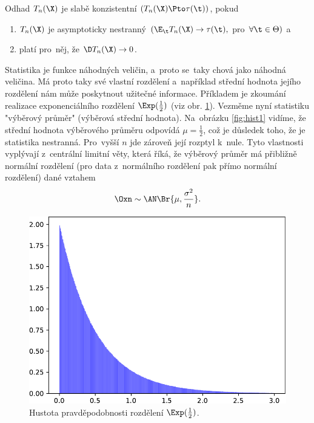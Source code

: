 \begin{theorem}
	Odhad $T_n(\X)$ je slabě konzistentní $(T_n(\X)\Pto\tau(\t))$, pokud \begin{enumerate}
		\item $T_n(\X)$ je asymptoticky nestranný $(\E_\t T_n(\X)\to\tau(\t),$ pro~$\forall\t\in\Theta)$ a
		\item platí pro~něj, že $\D T_n(\X)\to0$.
	\end{enumerate}
\end{theorem}

\begin{example}
	Statistika je funkce náhodných veličin, a~proto se~taky chová jako náhodná veličina. Má proto taky své vlastní rozdělení a~například střední hodnota jejího rozdělení nám může poskytnout užitečné informace. Příkladem je zkoumání realizace exponenciálního rozdělení $\Exp(\frac{1}{2})$ (viz obr. \ref{fig:hist0}). Vezměme nyní statistiku "výběrový průměr" (výběrová střední hodnota). Na~obrázku \ref{fig:hist1} vidíme, že střední hodnota výběrového průměru odpovídá $\mu=\frac{1}{2}$, což je důsledek toho, že je statistika nestranná. Pro~vyšší $n$ jde zároveň její rozptyl k~nule. Tyto vlastnosti vyplývají z~centrální limitní věty, která říká, že výběrový průměr má přibližně normální rozdělení (pro data z~normálního rozdělení pak přímo normální rozdělení) dané vztahem
	$$ \Oxn\sim\AN\Br{\mu,\frac{\sigma^2}{n}}. $$
	\begin{figure}[h]
		\centering
		\includegraphics[width=0.3\linewidth]{Images/histexp0}
		\caption{Hustota pravděpodobnosti rozdělení $\Exp(\frac{1}{2})$.}
		\label{fig:hist0}
	\end{figure}
	

\end{example}
